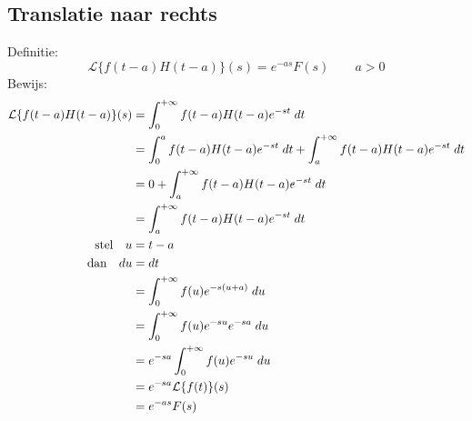 \subsection{Translatie naar rechts}
Definitie:
$$\mathcal{L}\{f(t - a)H(t - a)\}(s) = e^{-as}F(s) \qquad a > 0$$
Bewijs:
\begin{equation*}
\begin{split}
\mathcal{L}\{f(t - a)H(t - a)\}(s) & = \int_{0}^{+\infty}f(t - a)H(t - a)e^{-st} \; dt \\
                                    & = \int_{0}^{a}f(t - a)H(t - a)e^{-st} \; dt + \int_{a}^{+\infty}f(t - a)H(t - a)e^{-st} \; dt \\
                                    & = 0 +\int_{a}^{+\infty}f(t - a)H(t - a)e^{-st} \; dt \\
                                    & = \int_{a}^{+\infty}f(t - a)H(t - a)e^{-st} \; dt \\
                                    \hbox{stel}\quad u & = t - a \\
                                    \hbox{dan}\quad du & = dt \\    
                                    & = \int_{0}^{+\infty}f(u)e^{-s(u + a)} \; du \\
                                    & = \int_{0}^{+\infty}f(u)e^{-su}e^{-sa} \; du \\
                                    & = e^{-sa}\int_{0}^{+\infty}f(u)e^{-su} \; du \\
                                    & = e^{-sa}\mathcal{L}\{f(t)\}(s) \\
                                    & = e^{-as}F(s)
\end{split}
\end{equation*}
